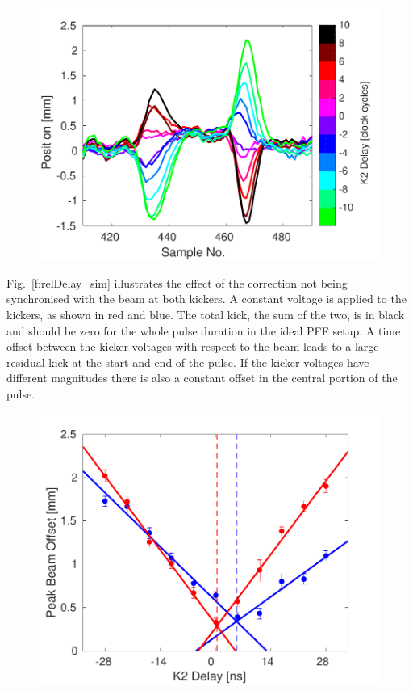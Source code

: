 \documentclass[%
 reprint,
 superscriptaddress,
 amsmath,
 amssymb,
 prstab,
]{revtex4-1}
\begin{document}
\begin{figure}
	\includegraphics[width=\columnwidth]{figs/comis/relDelay_traces}%
	\caption{\label{f:relDelay_traces}
	}
\end{figure}

Fig.~\ref{f:relDelay_sim} illustrates the effect of the 
correction not being synchronised with the beam at 
both kickers. A constant voltage is applied to the kickers, as shown in red and 
blue. The total kick, the sum of the two, is in black and should be zero for 
the whole pulse duration in the ideal PFF setup. A time offset between the 
kicker voltages with respect to the beam leads to a large residual kick at the 
start and end of the pulse. If the kicker voltages have different magnitudes 
there is also a constant offset in the central portion of the pulse.

\begin{figure}
	\includegraphics[width=\columnwidth]{figs/comis/relDelay_fit}%
	\caption{\label{f:relDelay_fit}
	}
\end{figure}
\end{document}
